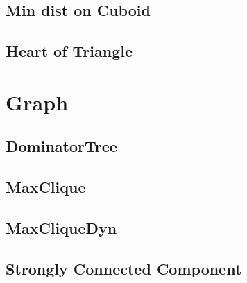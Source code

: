 \documentclass[a4paper,10pt,twocolumn,oneside]{article}
\begin{document}
%

\subsection{Min dist on Cuboid}


\subsection{Heart of Triangle}


\section{Graph}
%

\subsection{DominatorTree}


\subsection{MaxClique}
% 


\subsection{MaxCliqueDyn}


%

\subsection{Strongly Connected Component}

\end{document}
